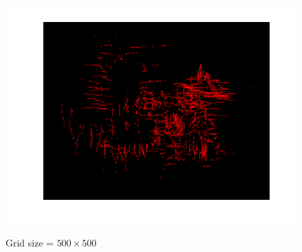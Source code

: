 {				\begin{figure}[position = here]
					\begin{centering}
						\includegraphics[scale=1]{./images/q2/heatmap_obstacles_500.png}\\
						\caption{Grid size = ${500 \times 500}$}
					\end{centering}
				\end{figure}
				\newline
				\pagebreak
		
}
